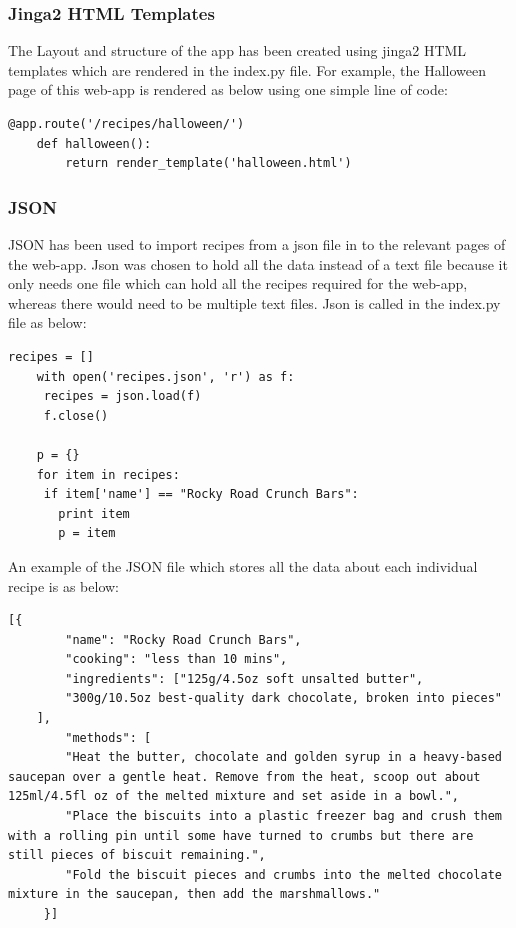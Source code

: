 \documentclass[10pt, a4paper]{article}
\begin{document}
    \subsubsection{Jinga2 HTML Templates}
    The Layout and structure of the app has been created using jinga2 HTML templates which are rendered in the index.py file. For example, the Halloween page of this web-app is rendered as below using one simple line of code: 
    \begin{lstlisting}[caption = Render Template Example]
    @app.route('/recipes/halloween/')
    def halloween():
        return render_template('halloween.html')
    \end{lstlisting}
    
    \subsubsection{JSON}
    JSON has been used to import recipes from a json file in to the relevant pages of the web-app. Json was chosen to hold all the data instead of a text file because it only needs one file which can hold all the recipes required for the web-app, whereas there would need to be multiple text files. Json is called in the index.py file as below:
    \begin{lstlisting}[caption = JSON in index.py File]
    recipes = []
    with open('recipes.json', 'r') as f:
     recipes = json.load(f)
     f.close()

    p = {}
    for item in recipes:
     if item['name'] == "Rocky Road Crunch Bars":
       print item
       p = item
    \end{lstlisting}
    
    An example of the JSON file which stores all the data about each individual recipe is as below:
    \begin{lstlisting}[caption = JSON File Storing Recipe Data]
    [{
	    "name": "Rocky Road Crunch Bars",
	    "cooking": "less than 10 mins",
	    "ingredients": ["125g/4.5oz soft unsalted butter",
		"300g/10.5oz best-quality dark chocolate, broken into pieces"
	],
	    "methods": [
		"Heat the butter, chocolate and golden syrup in a heavy-based saucepan over a gentle heat. Remove from the heat, scoop out about 125ml/4.5fl oz of the melted mixture and set aside in a bowl.",
		"Place the biscuits into a plastic freezer bag and crush them with a rolling pin until some have turned to crumbs but there are still pieces of biscuit remaining.",
		"Fold the biscuit pieces and crumbs into the melted chocolate mixture in the saucepan, then add the marshmallows."
	 }]
    \end{lstlisting}
    
\end{document}
